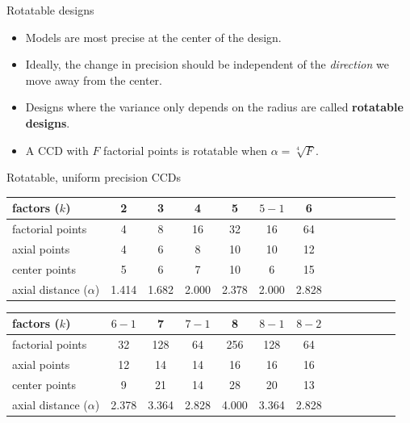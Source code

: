 \documentclass[10pt]{beamer}\usepackage[]{graphicx}\usepackage[]{color}
\begin{document}
\begin{frame}{Rotatable designs}

\begin{itemize}
	\item Models are most precise at the center of the design.
	\item<2-> Ideally, the change in precision should be independent of the \emph{direction} we move away from the center.
\end{itemize}



\begin{itemize}
	\item<4-> Designs where the variance only depends on the radius are called \textbf{rotatable designs}.
	\item<5-> A CCD with $F$ factorial points is rotatable when $\alpha=\sqrt[4]{F}$.
\end{itemize}
\end{frame}

\begin{frame}{Rotatable, uniform precision CCDs}
	\begin{tabular}{lcccccccccccc}
	  factors ($k$) & 2 & 3 & 4 & 5 & $5-1$ & 6 \\
	  \hline
	  factorial points & 4 & 8 & 16 & 32 & 16 & 64 \\
	  axial points & 4 & 6 & 8 & 10 & 10 & 12 \\
	  center points & 5 & 6 & 7 & 10 & 6 & 15 \\
	  axial distance ($\alpha$) & 1.414 & 1.682 & 2.000 & 2.378 & 2.000 & 2.828
	\end{tabular}

	\bigskip\bigskip
	\begin{tabular}{lcccccccccccc}
	  factors ($k$) & $6-1$ & 7 & $7-1$ & 8 & $8-1$ & $8-2$ \\
	  \hline
	  factorial points & 32 & 128 & 64 & 256 & 128 & 64 \\
	  axial points & 12 & 14 & 14 & 16 & 16 & 16 \\
	  center points & 9 & 21 & 14 & 28 & 20 & 13 \\
	  axial distance ($\alpha$) & 2.378 & 3.364 & 2.828 & 4.000 & 3.364 & 2.828
	\end{tabular}
\end{frame}
\end{document}
